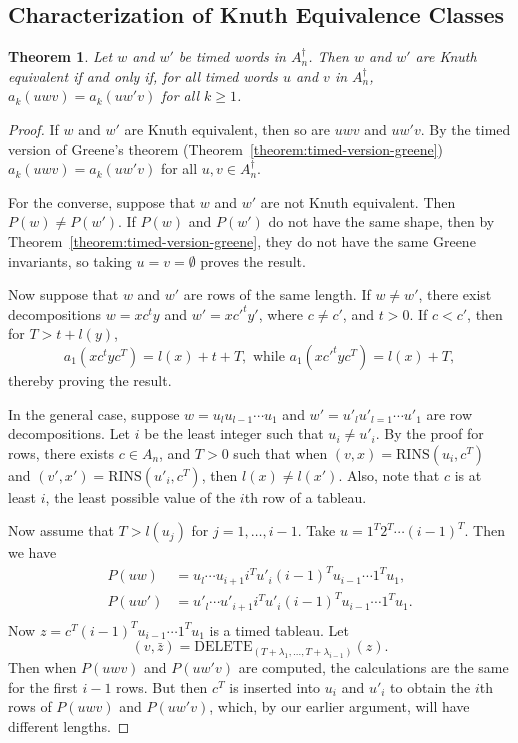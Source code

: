 \documentclass[10pt]{amsproc}
\newtheorem{theorem}{Theorem}[subsection]
\theoremstyle{definition}
\theoremstyle{remark}
\newcommand{\rowins}{\mathrm{RINS}}
\newcommand{\del}{\mathrm{DELETE}}
\begin{document}
\subsection{Characterization of Knuth Equivalence Classes}
\label{sec:char-timed-knuth}
\begin{theorem}
  Let $w$ and $w'$ be timed words in $A_n^\dagger$.
  Then $w$ and $w'$ are Knuth equivalent if and only if, for all timed words $u$ and $v$ in $A_n^\dagger$, $a_k(uwv)=a_k(uw'v)$ for all $k\geq 1$.
\end{theorem}
\begin{proof}
  If $w$ and $w'$ are Knuth equivalent, then so are $uwv$ and $uw'v$.
  By the timed version of Greene's theorem (Theorem~\ref{theorem:timed-version-greene}) $a_k(uwv)=a_k(uw'v)$ for all $u,v\in A_n^\dagger$.

  For the converse, suppose that $w$ and $w'$ are not Knuth equivalent.
  Then $P(w)\neq P(w')$.
  If $P(w)$ and $P(w')$ do not have the same shape, then by Theorem~\ref{theorem:timed-version-greene}, they do not have the same Greene invariants, so taking $u=v=\emptyset$ proves the result.

  Now suppose that $w$ and $w'$ are rows of the same length.
  If $w\neq w'$, there exist decompositions $w=xc^ty$ and $w'=x{c'}^ty'$, where $c\neq c'$, and $t>0$.
  If $c<c'$, then for $T>t+l(y)$,
  \begin{displaymath}
    a_1(xc^tyc^T) = l(x)+t+T, \text{ while } a_1(x{c'}^tyc^T) = l(x)+T,
  \end{displaymath}
  thereby proving the result.

  In the general case, suppose $w=u_lu_{l-1}\dotsb u_1$ and $w'=u'_lu'_{l=1}\dotsb u'_1$ are row decompositions.
  Let $i$ be the least integer such that $u_i\neq u'_i$.
  By the proof for rows, there exists $c\in A_n$, and $T>0$ such that when $(v,x)=\rowins(u_i,c^T)$ and $(v',x')=\rowins(u'_i,c^T)$, then $l(x)\neq l(x')$.
  Also, note that $c$ is at least $i$, the least possible value of the $i$th row of a tableau.

  Now assume that $T>l(u_j)$ for $j=1,\dotsc,i-1$.
  Take $u=1^T2^T\dotsb (i-1)^T$.
  Then we have
  \begin{align*}
    P(uw)&=u_l\dotsb u_{i+1} i^T u'_i (i-1)^T u_{i-1} \dotsb 1^T u_1,\\
    P(uw')&=u'_l\dotsb u'_{i+1} i^T u'_i (i-1)^T u_{i-1} \dotsb 1^T u_1.\\
  \end{align*}
  Now $z=c^T(i-1)^T u_{i-1} \dotsb 1^T u_1$ is a timed tableau.
  Let 
  \begin{displaymath}
    (v,\bar z)=\del_{(T+\lambda_1,\dotsc,T+\lambda_{i-1})}(z).
  \end{displaymath}
  Then when $P(uwv)$ and $P(uw'v)$ are computed, the calculations are the same for the first $i-1$ rows.
  But then $c^T$ is inserted into $u_i$ and $u'_i$ to obtain the $i$th rows of $P(uwv)$ and $P(uw'v)$, which, by our earlier argument, will have different lengths.
\end{proof}
\end{document}
